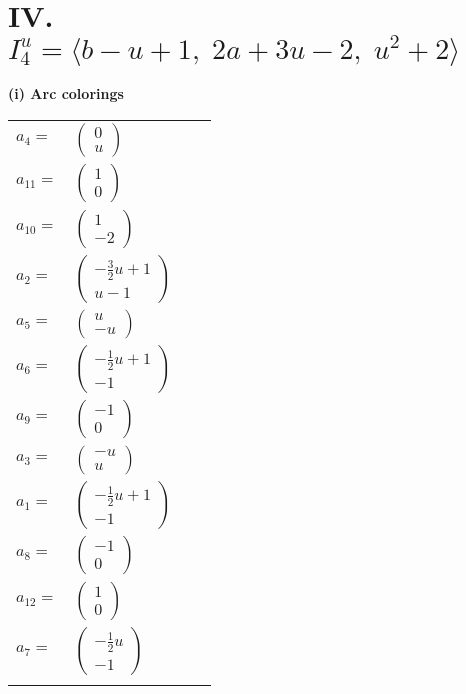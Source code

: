 \documentclass[1p]{elsarticle_modified}
\theoremstyle{definition}
\begin{document}
\centering \section*{IV. $I^u_{4}= \langle b- u+1,\;2 a+3 u-2,\;u^2+2 \rangle$}
\flushleft \textbf{(i) Arc colorings}\\
\begin{tabular}{m{7pt} m{180pt} m{7pt} m{180pt} }
\flushright $a_{4}=$&$\begin{pmatrix}0\\u\end{pmatrix}$ \\
\flushright $a_{11}=$&$\begin{pmatrix}1\\0\end{pmatrix}$ \\
\flushright $a_{10}=$&$\begin{pmatrix}1\\-2\end{pmatrix}$ \\
\flushright $a_{2}=$&$\begin{pmatrix}-\frac{3}{2} u+1\\u-1\end{pmatrix}$ \\
\flushright $a_{5}=$&$\begin{pmatrix}u\\- u\end{pmatrix}$ \\
\flushright $a_{6}=$&$\begin{pmatrix}-\frac{1}{2} u+1\\-1\end{pmatrix}$ \\
\flushright $a_{9}=$&$\begin{pmatrix}-1\\0\end{pmatrix}$ \\
\flushright $a_{3}=$&$\begin{pmatrix}- u\\u\end{pmatrix}$ \\
\flushright $a_{1}=$&$\begin{pmatrix}-\frac{1}{2} u+1\\-1\end{pmatrix}$ \\
\flushright $a_{8}=$&$\begin{pmatrix}-1\\0\end{pmatrix}$ \\
\flushright $a_{12}=$&$\begin{pmatrix}1\\0\end{pmatrix}$ \\
\flushright $a_{7}=$&$\begin{pmatrix}-\frac{1}{2} u\\-1\end{pmatrix}$\\&\end{tabular}
\end{document}
